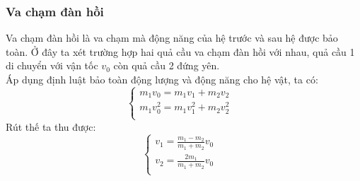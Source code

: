 \subsubsection{Va chạm đàn hồi}
Va chạm đàn hồi là va chạm mà động năng của hệ trước và sau hệ được bảo toàn. Ở đây ta xét trường hợp hai quả cầu va chạm đàn hồi với nhau, quả cầu 1 di chuyển với vận tốc $v_{0}$ còn quả cầu 2 đứng yên.
\\Áp dụng định luật bảo toàn động lượng và động năng cho hệ vật, ta có:
$$\left\{\begin{array}{ll}
    m_{1}v_{0}=m_{1}v_{1}+m_{2}v_{2} &\\
    m_{1}v_{0}^2=m_{1}v_{1}^2+m_{2}v_{2}^2 &\\
    \end{array}\right.$$
Rút thế ta thu được:
$$\left\{\begin{array}{ll}
    v_{1}=\frac{m_{1}-m_{2}}{m_{1}+m_{2}}v_{0} &\\
    v_{2}=\frac{2m_{1}}{m_{1}+m_{2}}v_{0 } &\\
    \end{array}\right.$$
